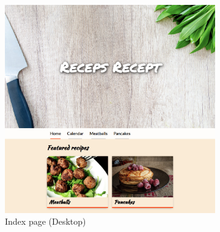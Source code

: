 \documentclass[a4paper]{scrartcl}
\begin{document}
\begin{figure}
	\centering
	\begin{subfigure}[b]{0.7\linewidth}
		\includegraphics[width=\linewidth]{images/screenshot-index.jpg}
		\caption{Index page (Desktop)}
		\label{fig:index-page}
	\end{subfigure}
	\begin{subfigure}[b]{0.2\linewidth}

\end{subfigure}
\end{figure}
\end{document}

